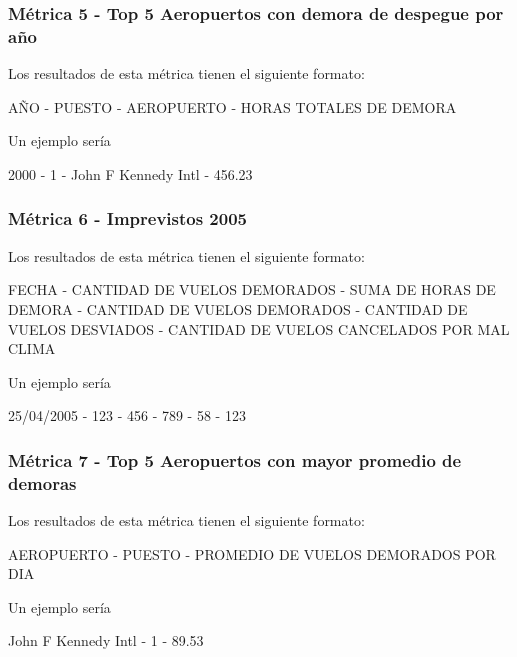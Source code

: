 \documentclass[a4paper,10pt]{article}
\begin{document}
        \subsubsection{Métrica 5 - Top 5 Aeropuertos con demora de despegue por año}
        Los resultados de esta métrica tienen el siguiente formato:\\
            \begin{center}
                AÑO - PUESTO - AEROPUERTO - HORAS TOTALES DE DEMORA\\
            \end{center}

            Un ejemplo sería\\
            \begin{center}
               2000 - 1 - John F Kennedy Intl - 456.23\\
            \end{center}
        \subsubsection{Métrica 6 - Imprevistos 2005}
            Los resultados de esta métrica tienen el siguiente formato:\\
            \begin{center}
                FECHA - CANTIDAD DE VUELOS DEMORADOS - SUMA DE HORAS DE DEMORA - CANTIDAD DE VUELOS DEMORADOS - CANTIDAD DE VUELOS DESVIADOS - CANTIDAD DE VUELOS CANCELADOS POR MAL CLIMA\\
            \end{center}

            Un ejemplo sería\\
            \begin{center}
            25/04/2005 - 123 - 456 - 789 - 58 - 123\\
            \end{center}
        \subsubsection{Métrica 7 - Top 5 Aeropuertos con mayor promedio de demoras}
        Los resultados de esta métrica tienen el siguiente formato:\\
            \begin{center}
                AEROPUERTO - PUESTO - PROMEDIO DE VUELOS DEMORADOS POR DIA
            \end{center}

            Un ejemplo sería\\
            \begin{center}
            John F Kennedy Intl - 1 - 89.53\\
            \end{center}
\end{document}
